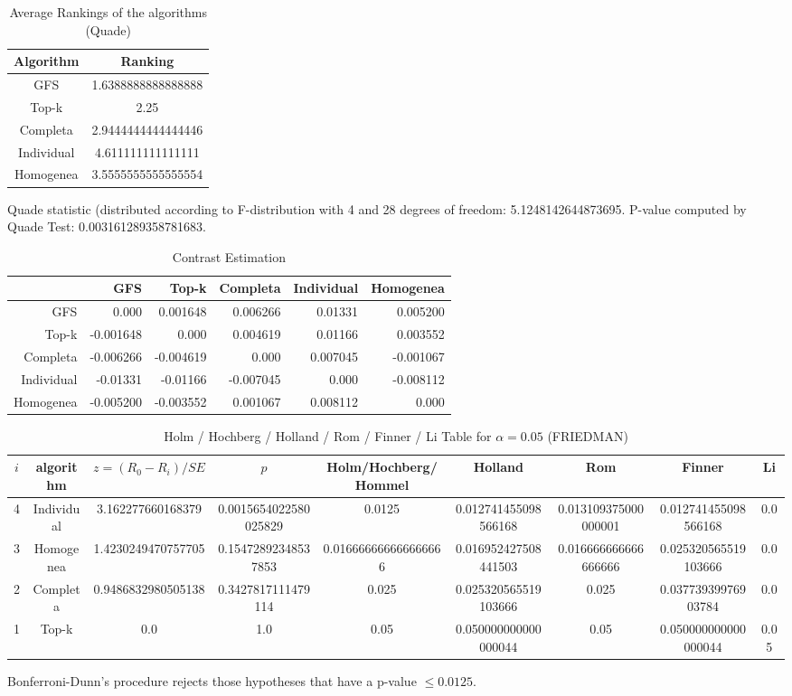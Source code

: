 \documentclass[a4paper,10pt]{article}
\begin{document}
\begin{landscape}
\newpage

\begin{table}[!htp]
\centering
\caption{Average Rankings of the algorithms (Quade)
}\begin{tabular}{c|c}
Algorithm&Ranking\\
\hline
GFS&1.6388888888888888\\
Top-k&2.25\\
Completa&2.9444444444444446\\
Individual&4.611111111111111\\
Homogenea&3.5555555555555554\\
\end{tabular}
\end{table}
Quade statistic (distributed according to F-distribution with 4 and 28 degrees of freedom: 5.1248142644873695. 
P-value computed by Quade Test: 0.003161289358781683.\newline


\newpage

\begin{table}[!htp]
\centering\tiny
\caption{Contrast Estimation}
\begin{tabular}{
|r|r|r|r|r|r|}
\hline
 &GFS&Top-k&Completa&Individual&Homogenea\\
\hline
GFS&0.000&0.001648&0.006266&0.01331&0.005200\\
\hline
Top-k&-0.001648&0.000&0.004619&0.01166&0.003552\\
\hline
Completa&-0.006266&-0.004619&0.000&0.007045&-0.001067\\
\hline
Individual&-0.01331&-0.01166&-0.007045&0.000&-0.008112\\
\hline
Homogenea&-0.005200&-0.003552&0.001067&0.008112&0.000\\
\hline

\end{tabular}
\end{table}

\newpage

\begin{table}[!htp]
\centering\scriptsize
\caption{Holm / Hochberg / Holland / Rom / Finner / Li Table for $\alpha=0.05$ (FRIEDMAN)}
\begin{tabular}{ccccccccc}
$i$&algorithm&$z=(R_0 - R_i)/SE$&$p$&Holm/Hochberg/Hommel&Holland&Rom&Finner&Li\\
\hline
4&Individual&3.162277660168379&0.0015654022580025829&0.0125&0.012741455098566168&0.013109375000000001&0.012741455098566168&0.0\\
3&Homogenea&1.4230249470757705&0.15472892348537853&0.016666666666666666&0.016952427508441503&0.016666666666666666&0.025320565519103666&0.0\\
2&Completa&0.9486832980505138&0.3427817111479114&0.025&0.025320565519103666&0.025&0.03773939976903784&0.0\\
1&Top-k&0.0&1.0&0.05&0.050000000000000044&0.05&0.050000000000000044&0.05\\
\hline
\end{tabular}
\end{table}
Bonferroni-Dunn's procedure rejects those hypotheses that have a p-value $\le0.0125$.



\end{landscape}
\end{document}
